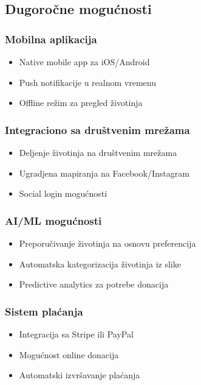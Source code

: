 \subsection{Dugoročne mogućnosti}

\subsubsection{Mobilna aplikacija}
\begin{itemize}
    \item Native mobile app za iOS/Android
    \item Push notifikacije u realnom vremenu
    \item Offline režim za pregled životinja
\end{itemize}

\subsubsection{Integraciono sa društvenim mrežama}
\begin{itemize}
    \item Deljenje životinja na društvenim mrežama
    \item Ugradjena mapiranja na Facebook/Instagram
    \item Social login mogućnosti
\end{itemize}

\subsubsection{AI/ML mogućnosti}
\begin{itemize}
    \item Preporučivanje životinja na osnovu preferencija
    \item Automatska kategorizacija životinja iz slike
    \item Predictive analytics za potrebe donacija
\end{itemize}

\subsubsection{Sistem plaćanja}
\begin{itemize}
    \item Integracija sa Stripe ili PayPal
    \item Mogućnost online donacija
    \item Automatski izvršavanje plaćanja
\end{itemize}

